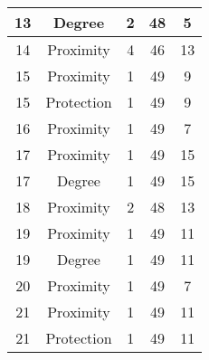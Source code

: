 \documentclass[results.tex]{subfiles}
\begin{document}
\begin{center}
\begin{tabular}{| c || c | c | c | c |}
            \hline
            13                      & Degree                       & 2                      & 48                      & 5                    \\
            \hline
            14                      & Proximity                    & 4                      & 46                      & 13                   \\
            \hline
            15                      & Proximity                    & 1                      & 49                      & 9                    \\
            \hline
            15                      & Protection                   & 1                      & 49                      & 9                    \\
            \hline
            16                      & Proximity                    & 1                      & 49                      & 7                    \\
            \hline
            17                      & Proximity                    & 1                      & 49                      & 15                   \\
            \hline
            17                      & Degree                       & 1                      & 49                      & 15                   \\
            \hline
            18                      & Proximity                    & 2                      & 48                      & 13                   \\
            \hline
            19                      & Proximity                    & 1                      & 49                      & 11                   \\
            \hline
            19                      & Degree                       & 1                      & 49                      & 11                   \\
            \hline
            20                      & Proximity                    & 1                      & 49                      & 7                    \\
            \hline
            21                      & Proximity                    & 1                      & 49                      & 11                   \\
            \hline
            21                      & Protection                   & 1                      & 49                      & 11                   \\

\end{tabular}
\end{center}
\end{document}
